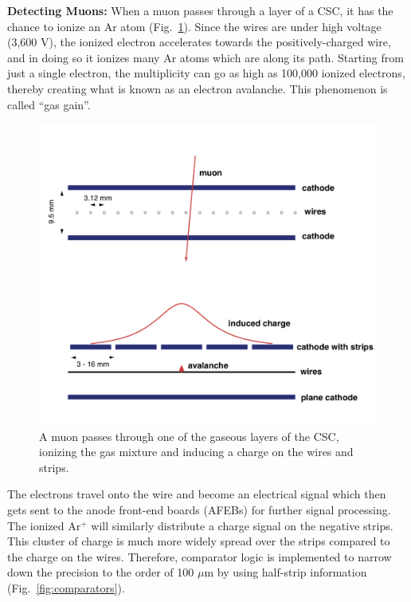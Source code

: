 {\bf Detecting Muons:}
When a muon passes through a layer of a CSC, it has the chance to ionize an Ar atom (Fig.~\ref{fig:elec_avalanche}).
Since the wires are under high voltage (3,600 V), the ionized electron accelerates towards the positively-charged wire, and in doing so it ionizes many Ar atoms which are along its path. 
Starting from just a single electron, the multiplicity can go as high as 100,000 ionized electrons, thereby creating what is known as an electron avalanche. 
This phenomenon is called ``gas gain''.
\begin{figure}[pbth]
\centering
\includegraphics[width=15cm,height=10cm,keepaspectratio]{figures/cms/muonsys/csc_elec_avalanche_old.png}
    \caption{
    A muon passes through one of the gaseous layers of the CSC, ionizing the gas mixture and inducing a charge on the wires and strips. 
    }
    \label{fig:elec_avalanche}
\end{figure}
The electrons travel onto the wire and become an electrical signal which then gets sent to the anode front-end boards (AFEBs) for further signal processing.
The ionized Ar$^+$ will similarly distribute a charge signal on the negative strips. 
This cluster of charge is much more widely spread over the strips compared to the charge on the wires.
Therefore, comparator logic is implemented to narrow down the precision to the order of 100 $\mu$m by using half-strip information (Fig.~\ref{fig:comparators}).
